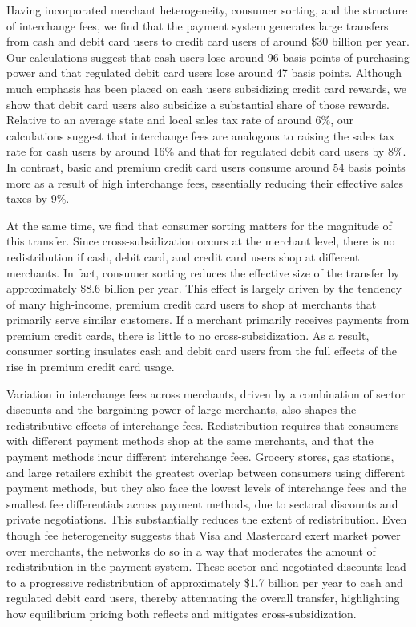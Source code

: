\documentclass[11pt,english]{article}
\theoremstyle{remark}
\begin{document}
Having incorporated merchant heterogeneity, consumer sorting, and the structure of interchange fees, we find that the payment system generates large transfers from cash and debit card users to credit card users of around \$30 billion per year.
Our calculations suggest that cash users lose around 96 basis points of purchasing power and that regulated debit card users lose around 47 basis points.
Although much emphasis has been placed on cash users subsidizing credit card rewards, we show that debit card users also subsidize a substantial share of those rewards.
Relative to an average state and local sales tax rate of around 6\%, our calculations suggest that interchange fees are analogous to raising the sales tax rate for cash users by around 16\% and that for regulated debit card users by 8\%.
In contrast, basic and premium credit card users consume around 54 basis points more as a result of high interchange fees, essentially reducing their effective sales taxes by 9\%.

At the same time, we find that consumer sorting matters for the magnitude of this transfer.
Since cross-subsidization occurs at the merchant level, there is no redistribution if cash, debit card, and credit card users shop at different merchants.
In fact, consumer sorting reduces the effective size of the transfer by approximately \$8.6 billion per year.
This effect is largely driven by the tendency of many high-income, premium credit card users to shop at merchants that primarily serve similar customers.
If a merchant primarily receives payments from premium credit cards, there is little to no cross-subsidization.
As a result, consumer sorting insulates cash and debit card users from the full effects of the rise in premium credit card usage.

Variation in interchange fees across merchants, driven by a combination of sector discounts and the bargaining power of large merchants, also shapes the redistributive effects of interchange fees.
Redistribution requires that consumers with different payment methods shop at the same merchants, and that the payment methods incur different interchange fees.
Grocery stores, gas stations, and large retailers exhibit the greatest overlap between consumers using different payment methods, but they also face the lowest levels of interchange fees and the smallest fee differentials across payment methods, due to sectoral discounts and private negotiations. This substantially reduces the extent of redistribution.  
Even though fee heterogeneity suggests that Visa and Mastercard exert market power over merchants, the networks do so in a way that moderates the amount of redistribution in the payment system.
These sector and negotiated discounts lead to a progressive redistribution of approximately \$1.7 billion per year to cash and regulated debit card users, thereby attenuating the overall transfer, highlighting how equilibrium pricing both reflects and mitigates cross-subsidization.
\end{document}
